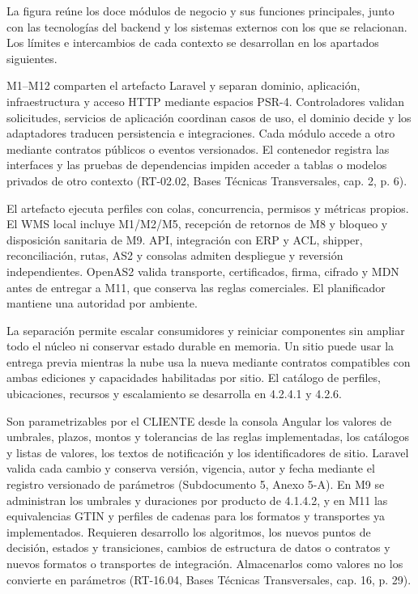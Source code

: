 La figura reúne los doce módulos de negocio y sus funciones principales, junto con las tecnologías del backend y los sistemas externos con los que se relacionan. Los límites e intercambios de cada contexto se desarrollan en los apartados siguientes.


M1--M12 comparten el artefacto Laravel y separan dominio, aplicación, infraestructura y acceso HTTP mediante espacios PSR-4. Controladores validan solicitudes, servicios de aplicación coordinan casos de uso, el dominio decide y los adaptadores traducen persistencia e integraciones. Cada módulo accede a otro mediante contratos públicos o eventos versionados. El contenedor registra las interfaces y las pruebas de dependencias impiden acceder a tablas o modelos privados de otro contexto (RT-02.02, Bases Técnicas Transversales, cap. 2, p. 6).

El artefacto ejecuta perfiles con colas, concurrencia, permisos y métricas propios. El WMS local incluye M1/M2/M5, recepción de retornos de M8 y bloqueo y disposición sanitaria de M9. API, integración con ERP y ACL, shipper, reconciliación, rutas, AS2 y consolas admiten despliegue y reversión independientes. OpenAS2 valida transporte, certificados, firma, cifrado y MDN antes de entregar a M11, que conserva las reglas comerciales. El planificador mantiene una autoridad por ambiente.

La separación permite escalar consumidores y reiniciar componentes sin ampliar todo el núcleo ni conservar estado durable en memoria. Un sitio puede usar la entrega previa mientras la nube usa la nueva mediante contratos compatibles con ambas ediciones y capacidades habilitadas por sitio. El catálogo de perfiles, ubicaciones, recursos y escalamiento se desarrolla en 4.2.4.1 y 4.2.6.

Son parametrizables por el CLIENTE desde la consola Angular los valores de umbrales, plazos, montos y tolerancias de las reglas implementadas, los catálogos y listas de valores, los textos de notificación y los identificadores de sitio. Laravel valida cada cambio y conserva versión, vigencia, autor y fecha mediante el registro versionado de parámetros (Subdocumento 5, Anexo 5-A). En M9 se administran los umbrales y duraciones por producto de 4.1.4.2, y en M11 las equivalencias GTIN y perfiles de cadenas para los formatos y transportes ya implementados. Requieren desarrollo los algoritmos, los nuevos puntos de decisión, estados y transiciones, cambios de estructura de datos o contratos y nuevos formatos o transportes de integración. Almacenarlos como valores no los convierte en parámetros (RT-16.04, Bases Técnicas Transversales, cap. 16, p. 29).

